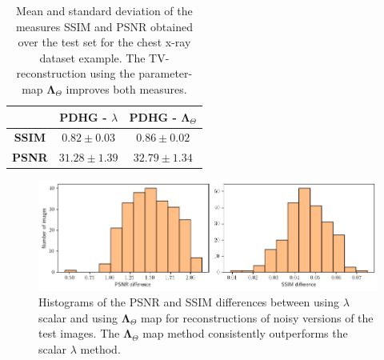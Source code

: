 \documentclass[12pt]{article}
\begin{document}
\begin{table}[H]
\centering

\begin{tabular}{c|c c}
 & \textbf{PDHG -} $\lambda$ & \textbf{PDHG -} $\mathbf{\Lambda}_{\Theta}$ \\
\hline
\textbf{SSIM} & $0.82 \pm 0.03$ & $\mathbf{0.86} \pm 0.02$ \\
\textbf{PSNR} & $31.28 \pm 1.39$ & $\mathbf{32.79} \pm 1.34$ \\
\end{tabular}



\caption{Mean and standard deviation of the measures SSIM and PSNR obtained over the test set for the chest x-ray dataset example. 
The TV-reconstruction using the parameter-map $\mathbf{\Lambda}_{\Theta}$ improves both measures.
}

\label{table:summary}

\end{table}



\begin{figure}[H]
  \centering
  \includegraphics[width=1\linewidth]{images//chest_xray/histograms.png}
  \caption{Histograms of the PSNR and SSIM differences between using $\lambda$ scalar and using $\mathbf{\Lambda}_{\Theta}$ map for
  reconstructions of noisy versions of the test images. 
  The $\mathbf{\Lambda}_{\Theta}$ map method consistently outperforms the scalar $\lambda$ method.
  }
  \label{fig:hist_diff}
\end{figure}
\end{document}
